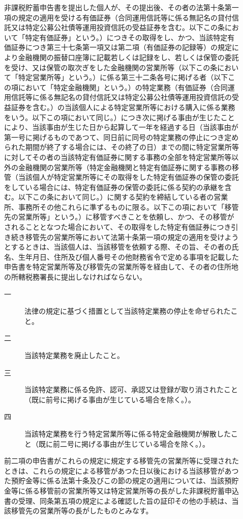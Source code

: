 \documentclass[twocolumn,a4j,10pt]{ltjtarticle}
\begin{document}
\begin{description}
\item[]非課税貯蓄申告書を提出した個人が、その提出後、その者の法第十条第一項の規定の適用を受ける有価証券（合同運用信託等に係る無記名の貸付信託又は特定公募公社債等運用投資信託の受益証券を含む。以下この条において「特定有価証券」という。）につきその取得をし、かつ、当該特定有価証券につき第三十七条第一項又は第二項（有価証券の記録等）の規定により金融機関の振替口座簿に記載若しくは記録をし、若しくは保管の委託を受け、又は保管の取次ぎをした金融機関の営業所等（以下この条において「特定営業所等」という。）に係る第三十二条各号に掲げる者（以下この項において「特定金融機関」という。）の特定業務（有価証券（合同運用信託等に係る無記名の貸付信託又は特定公募公社債等運用投資信託の受益証券を含む。）の当該個人による特定営業所等における購入に係る業務をいう。以下この項において同じ。）につき次に掲げる事由が生じたことにより、当該事由が生じた日から起算して一年を経過する日（当該事由が第一号に掲げるものであつて、同日前に同号の特定業務の停止につき定められた期間が終了する場合には、その終了の日）までの間に特定営業所等に対してその者の当該特定有価証券に関する事務の全部を特定営業所等以外の金融機関の営業所等（特定金融機関と特定有価証券に関する事務の移管（当該個人が特定営業所等にその取得をした特定有価証券の保管の委託をしている場合には、特定有価証券の保管の委託に係る契約の承継を含む。以下この条において同じ。）に関する契約を締結している者の営業所、事務所その他これらに準ずるものに限る。以下この項において「移管先の営業所等」という。）に移管すべきことを依頼し、かつ、その移管がされることとなつた場合において、その取得をした特定有価証券につき引き続き移管先の営業所等において法第十条第一項の規定の適用を受けようとするときは、当該個人は、当該移管を依頼する際、その旨、その者の氏名、生年月日、住所及び個人番号その他財務省令で定める事項を記載した申告書を特定営業所等及び移管先の営業所等を経由して、その者の住所地の所轄税務署長に提出しなければならない。
\begin{description}
\item[一]法律の規定に基づく措置として当該特定業務の停止を命ぜられたこと。
\item[二]当該特定業務を廃止したこと。
\item[三]当該特定業務に係る免許、認可、承認又は登録が取り消されたこと（既に前号に掲げる事由が生じている場合を除く。）。
\item[四]当該特定業務を行う特定営業所等に係る特定金融機関が解散したこと（既に前二号に掲げる事由が生じている場合を除く。）。
\end{description}
\item[]前二項の申告書がこれらの規定に規定する移管先の営業所等に受理されたときは、これらの規定による移管があつた日以後における当該移管があつた預貯金等に係る法第十条及びこの節の規定の適用については、当該預貯金等に係る移管前の営業所等又は特定営業所等の長がした非課税貯蓄申込書の受理、同条第五項の規定による確認した旨の証印その他の手続は、当該移管先の営業所等の長がしたものとみなす。

\end{description}
\end{document}

